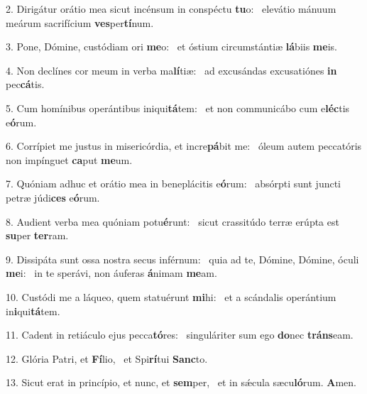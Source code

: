 2. Dirigátur orátio mea sicut incénsum in conspéctu \textbf{tu}o: \ast\  elevátio mánuum meárum sacrifícium \textbf{ves}per\textbf{tí}num.\

3. Pone, Dómine, custódiam ori \textbf{me}o: \ast\  et óstium circumstántiæ \textbf{lá}biis \textbf{me}is.\

4. Non declínes cor meum in verba ma\textbf{lí}tiæ: \ast\  ad excusándas excusatiónes \textbf{in} pec\textbf{cá}tis.\

5. Cum homínibus operántibus iniqui\textbf{tá}tem: \ast\  et non communicábo cum e\textbf{léc}tis e\textbf{ó}rum.\

6. Corrípiet me justus in misericórdia, et incre\textbf{pá}bit me: \ast\  óleum autem peccatóris non impínguet \textbf{ca}put \textbf{me}um.\

7. Quóniam adhuc et orátio mea in beneplácitis e\textbf{ó}rum: \ast\  absórpti sunt juncti petræ júdi\textbf{ces} e\textbf{ó}rum.\

8. Audient verba mea quóniam potu\textbf{é}runt: \ast\  sicut crassitúdo terræ erúpta est \textbf{su}per \textbf{ter}ram.\

9. Dissipáta sunt ossa nostra secus inférnum: \dag\  quia ad te, Dómine, Dómine, óculi \textbf{me}i: \ast\  in te sperávi, non áuferas \textbf{á}nimam \textbf{me}am.\

10. Custódi me a láqueo, quem statuérunt \textbf{mi}hi: \ast\  et a scándalis operántium in\textbf{i}qui\textbf{tá}tem.\

11. Cadent in retiáculo ejus pecca\textbf{tó}res: \ast\  singuláriter sum ego \textbf{do}nec \textbf{tráns}eam.\

12. Glória Patri, et \textbf{Fí}lio, \ast\  et Spi\textbf{rí}tui \textbf{Sanc}to.\

13. Sicut erat in princípio, et nunc, et \textbf{sem}per, \ast\  et in sǽcula sæcu\textbf{ló}rum. \textbf{A}men.\

